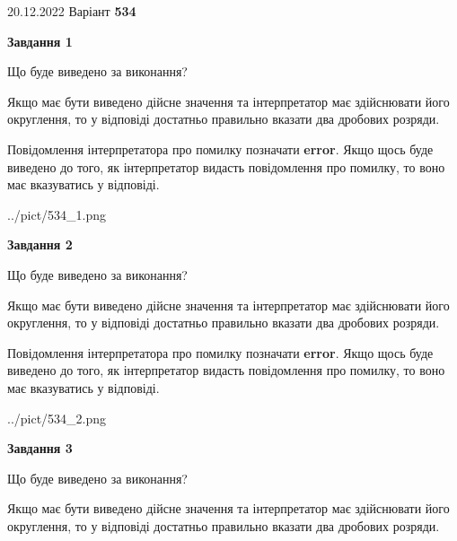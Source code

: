 \documentclass[12pt, ukrainian]{article}
\begin{document}
{20.12.2022 Варіант \No \textbf { 534 }\par}
{
\begin {Large}

{\begin {center}\textbf{Завдання 1}\end {center}}\par
Що буде виведено за виконання? \par

Якщо має бути виведено дійсне значення та інтерпретатор має здійснювати його округлення, 
то у відповіді достатньо правильно вказати два дробових розряди.

Повідомлення інтерпретатора про помилку позначати \textbf{error}.
Якщо щось буде виведено до того, як інтерпретатор видасть повідомлення про помилку, 
то воно має вказуватись у відповіді. \par

\begin{center}
	{../pict/534_1.png}
\end{center}
\newpage

{\begin {center}\textbf{Завдання 2}\end {center}}\par
Що буде виведено за виконання? \par

Якщо має бути виведено дійсне значення та інтерпретатор має здійснювати його округлення, 
то у відповіді достатньо правильно вказати два дробових розряди.

Повідомлення інтерпретатора про помилку позначати \textbf{error}.
Якщо щось буде виведено до того, як інтерпретатор видасть повідомлення про помилку, 
то воно має вказуватись у відповіді. \par

\begin{center}
	{../pict/534_2.png}
\end{center}
\newpage

{\begin {center}\textbf{Завдання 3}\end {center}}\par
Що буде виведено за виконання? \par

Якщо має бути виведено дійсне значення та інтерпретатор має здійснювати його округлення, 
то у відповіді достатньо правильно вказати два дробових розряди.


\end{Large}}
\end{document}
